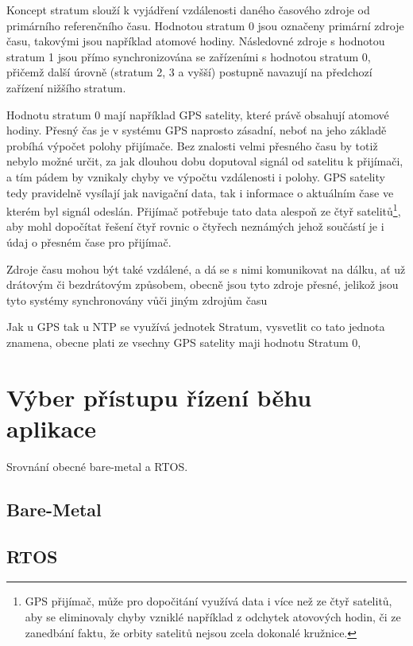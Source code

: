 Koncept stratum slouží k vyjádření vzdálenosti daného časového zdroje od primárního referenčního času. Hodnotou stratum 0 jsou označeny primární zdroje času, takovými jsou například atomové hodiny. Následovné zdroje s hodnotou stratum 1 jsou přímo synchronizována se zařízeními s hodnotou stratum 0, přičemž další úrovně (stratum 2, 3 a vyšší) postupně navazují na předchozí zařízení nižšího stratum.

Hodnotu stratum 0 mají například GPS satelity, které právě obsahují atomové hodiny. Přesný čas je v systému GPS naprosto zásadní, neboť na jeho základě probíhá výpočet polohy přijímače. Bez znalosti velmi přesného času by totiž nebylo možné určit, za jak dlouhou dobu doputoval signál od satelitu k přijímači, a tím pádem by vznikaly chyby ve výpočtu vzdálenosti i polohy. GPS satelity tedy pravidelně vysílají jak navigační data, tak i informace o aktuálním čase ve kterém byl signál odeslán. Přijímač potřebuje tato data alespoň ze čtyř satelitů\footnote{GPS přijímač, může pro dopočitání využívá data i více než ze čtyř satelitů, aby se eliminovaly chyby vzniklé například z odchytek atovových hodin, či ze zanedbání faktu, že orbity satelitů nejsou zcela dokonalé kružnice.}, aby mohl dopočítat řešení čtyř rovnic o čtyřech neznámých jehož součástí je i údaj o přesném čase pro přijímač.

Zdroje času mohou být také vzdálené, a dá se s nimi komunikovat na dálku, ať už drátovým či bezdrátovým způsobem, obecně jsou tyto zdroje přesné, jelikož jsou tyto systémy synchronovány vůči jiným zdrojům času

Jak u GPS tak u NTP se využívá jednotek Stratum, vysvetlit co tato jednota znamena, obecne plati ze vsechny GPS satelity maji hodnotu Stratum 0, 

\section{Výber přístupu řízení běhu aplikace}
Srovnání obecné bare-metal a RTOS.


\subsection{Bare-Metal}

\subsection{RTOS}

